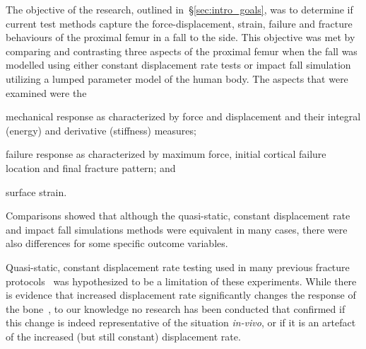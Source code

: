 The objective of the research, outlined in~\S\ref{sec:intro_goals}, was to determine if current test methods capture the force-displacement, strain, failure and fracture behaviours of the proximal femur in a fall to the side.
This objective was met by comparing and contrasting three aspects of the proximal femur when the fall was modelled using either constant displacement rate tests or impact fall simulation utilizing a lumped parameter model of the human body.
The aspects that were examined were the
\begin{inparaenum}[(i)]
\item mechanical response as characterized by force and displacement and their integral (energy) and derivative (stiffness) measures;
\item failure response as characterized by maximum force, initial cortical failure location and final fracture pattern; and
\item surface strain.
\end{inparaenum}
Comparisons showed that although the quasi-static, constant displacement rate and impact fall simulations methods were equivalent in many cases, there were also differences for some specific outcome variables.

Quasi-static, constant displacement rate testing used in many previous fracture protocols~\citep{backman_proximal_1957, beckmann_femoroplasty--augmentation_2007, boehm_prediction_2008, courtney_age-related_1995, eckstein_reproducibility_2004, heini_femoroplasty-augmentation_2004, keyak_relationships_2000, lochmuller_mechanical_2002, lotz_use_1990} was hypothesized to be a limitation of these experiments.
While there is evidence that increased displacement rate significantly changes the response of the bone~\citep{courtney_effects_1994, weber_proximal_1992}, to our knowledge no research has been conducted that confirmed if this change is indeed representative of the situation \textit{in-vivo}, or if it is an artefact of the increased (but still constant) displacement rate.

